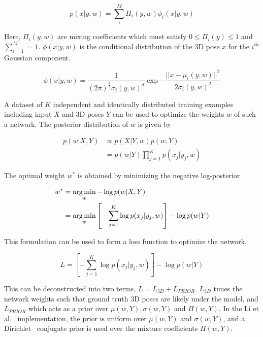 \begin{equation}
  p(x | y, w) = \sum_{i}^{M} \Pi_{i}(y, w)\phi_{i}(x | y, w)
\end{equation}

Here, $\Pi_{i}(y, w)$ are mixing coefficients which must satisfy $0 \leq \Pi_{i}(y) \leq 1$ and $\sum_{i=1}^{M} = 1$. $\phi(x | y, w)$ is the conditional distribution of the 3D pose $x$ for the $i^{th}$ Gaussian component. 

\begin{equation}
  \phi(x | y, w) = 
    \frac{
      1
    }{
      (2\pi)^{\frac{d}{2}} \sigma_{i}(y, w)^{d}
    } 
    \exp{
    -\frac{
      || x - \mu_{i}(y, w) ||^{2}
    }{
      2\sigma_{i}(y, w)^{2}
    }
  }
\end{equation}

A dataset of $K$ independent and identically distributed training examples including input $X$ and 3D poses $Y$ can be used to optimize the weights $w$ of such a network. The posterior distribution of $w$ is given by

\begin{align}
  p(w | X, Y) 
  &\propto p(X | Y, w)p(w, Y) \\
  &= p(w | Y) \prod_{j=1}^{K} p(x_j | y_j, w)
\end{align}

The optimal weight $w^{*}$ is obtained by minimizing the negative log-posterior

\begin{align}
  w^{*} &= \operatorname*{arg\,min}_{w} -\log p(w | X, Y) \\
        &= \operatorname*{arg\,min}_{w} \left[-\sum_{j=1}^{K} \log p(x_j | y_j, w)\right] - \log p(w | Y)
\end{align}

This formulation can be used to form a loss function to optimize the network. 

\begin{equation}
  L = \left[-\sum_{j=1}^{K} \log p(x_j | y_j, w)\right] - \log p(w | Y)
\end{equation}

This can be deconstructed into two terms, $L = L_{3D} + L_{PRIOR}$. $L_{3D}$ tunes the network weights such that ground truth 3D poses are likely under the model, and $L_{PRIOR}$ which acts as a prior over $\mu(w, Y), \sigma(w, Y)$ and $\Pi(w, Y)$. In the Li et al.~\cite{xxx} implementation, the prior is uniform over $\mu(w, Y)$ and $\sigma(w, Y)$, and a Dirichlet~\cite{xxx} conjugate prior is used over the mixture coefficients $\Pi(w, Y)$. 

